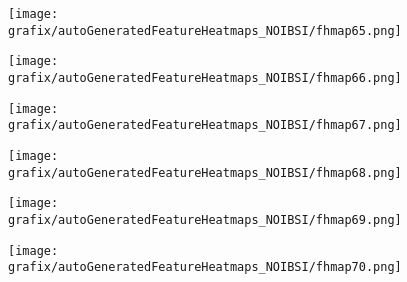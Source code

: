 \hspace{\hsp} 
\begin{subfigure}{\wid\textwidth} 
    \centering 
    \caption{\tiny \sffamily {}} 
    \vspace{\vsp} 
    \texttt{[image: grafix/autoGeneratedFeatureHeatmaps\_NOIBSI/fhmap65.png]} 
\end{subfigure} 
\hspace{\hsp} 
\begin{subfigure}{\wid\textwidth} 
    \centering 
    \caption{\tiny \sffamily {}} 
    \vspace{\vsp} 
    \texttt{[image: grafix/autoGeneratedFeatureHeatmaps\_NOIBSI/fhmap66.png]} 
\end{subfigure} 
\hspace{\hsp} 
\begin{subfigure}{\wid\textwidth} 
    \centering 
    \caption{\tiny \sffamily {}} 
    \vspace{\vsp} 
    \texttt{[image: grafix/autoGeneratedFeatureHeatmaps\_NOIBSI/fhmap67.png]} 
\end{subfigure} 
\hspace{\hsp} 
\begin{subfigure}{\wid\textwidth} 
    \centering 
    \caption{\tiny \sffamily {}} 
    \vspace{\vsp} 
    \texttt{[image: grafix/autoGeneratedFeatureHeatmaps\_NOIBSI/fhmap68.png]} 
\end{subfigure} 
\hspace{\hsp} 
\begin{subfigure}{\wid\textwidth} 
    \centering 
    \caption{\tiny \sffamily {}} 
    \vspace{\vsp} 
    \texttt{[image: grafix/autoGeneratedFeatureHeatmaps\_NOIBSI/fhmap69.png]} 
\end{subfigure} 
\hspace{\hsp} 
\begin{subfigure}{\wid\textwidth} 
    \centering 
    \caption{\tiny \sffamily {}} 
    \vspace{\vsp} 
    \texttt{[image: grafix/autoGeneratedFeatureHeatmaps\_NOIBSI/fhmap70.png]} 
\end{subfigure} 
\hspace{\hsp} 
